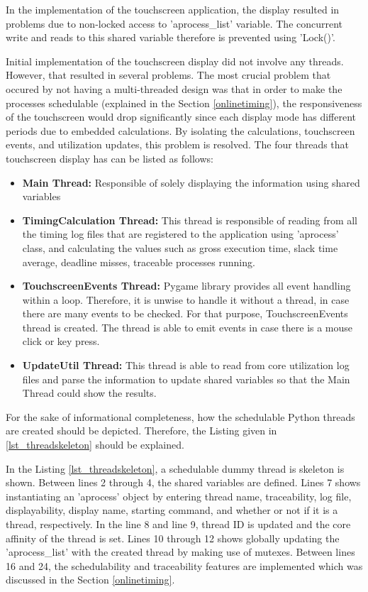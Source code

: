 In the implementation of the touchscreen application, the display resulted in problems due to non-locked access to 'aprocess{\_}list' variable. The concurrent write and reads to this shared variable therefore is prevented using 'Lock()'.

Initial implementation of the touchscreen display did not involve any threads. However, that resulted in several problems. The most crucial problem that occured by not having a multi-threaded design was that in order to make the processes schedulable (explained in the Section \ref{onlinetiming}), the responsiveness of the touchscreen would drop significantly since each display mode has different periods due to embedded calculations. By isolating the calculations, touchscreen events, and utilization updates, this problem is resolved. The four threads that touchscreen display has can be listed as follows:

\begin{itemize}
	\item \textbf{Main Thread:} Responsible of solely displaying the information using shared variables
	\item \textbf{TimingCalculation Thread:} This thread is responsible of reading from all the timing log files that are registered to the application using 'aprocess' class, and calculating the values such as gross execution time, slack time average, deadline misses, traceable processes running.
	\item \textbf{TouchscreenEvents Thread:} Pygame library provides all event handling within a loop. Therefore, it is unwise to handle it without a thread, in case there are many events to be checked. For that purpose, TouchscreenEvents thread is created. The thread is able to emit events in case there is a mouse click or key press.
	\item \textbf{UpdateUtil Thread:} This thread is able to read from core utilization log files and parse the information to update shared variables so that the Main Thread could show the results.
\end{itemize}

For the sake of informational completeness, how the schedulable Python threads are created should be depicted. Therefore, the Listing given in \ref{lst_threadskeleton} should be explained.



In the Listing \ref{lst_threadskeleton}, a schedulable dummy thread is skeleton is shown. Between lines 2 through 4, the shared variables are defined. Lines 7 shows instantiating an 'aprocess' object by entering thread name, traceability, log file, displayability, display name, starting command, and whether or not if it is a thread, respectively. In the line 8 and line 9, thread ID is updated and the core affinity of the thread is set. Lines 10 through 12 shows globally updating the 'aprocess{\_}list' with the created thread by making use of mutexes. Between lines 16 and 24, the schedulability and traceability features are implemented which was discussed in the Section \ref{onlinetiming}.

